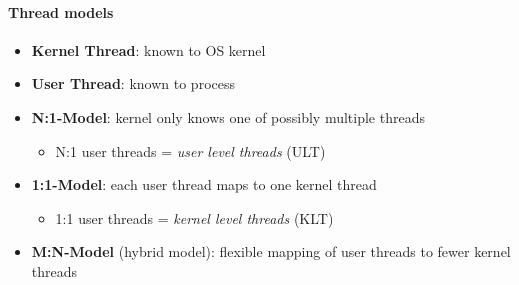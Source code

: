 \paragraph{Thread models}
\begin{itemize}
  \item \textbf{Kernel Thread}: known to OS kernel
  \item \textbf{User Thread}: known to process
  \item \textbf{N:1-Model}: kernel only knows one of possibly multiple threads
  \begin{itemize}
    \item N:1 user threads = \emph{user level threads} (ULT)
  \end{itemize}
  \item \textbf{1:1-Model}: each user thread maps to one kernel thread
  \begin{itemize}
    \item 1:1 user threads = \emph{kernel level threads} (KLT)
  \end{itemize}
  \item \textbf{M:N-Model} (hybrid model): flexible mapping of user threads to fewer kernel threads 
\end{itemize}

